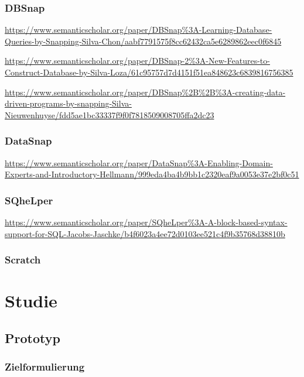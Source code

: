 \documentclass[oneside,a4paper,11pt,openright]{scrreprt}
\begin{document}
\clearpage



% 



\clearpage


\subsection{DBSnap}
\parencite{silvaDBSnapLearning2015}
\url{https://www.semanticscholar.org/paper/DBSnap\%3A-Learning-Database-Queries-by-Snapping-Silva-Chon/aabf7791575f8cc62432ca5e6289862eec0f6845}

\url{https://www.semanticscholar.org/paper/DBSnap-2\%3A-New-Features-to-Construct-Database-by-Silva-Loza/61c95757d7d4151f51ea848623c6839816756385}

\url{https://www.semanticscholar.org/paper/DBSnap\%2B\%2B\%3A-creating-data-driven-programs-by-snapping-Silva-Nieuwenhuyse/fdd5ae1bc33337f9f0f7818509008705ffa2dc23}

\subsection{DataSnap}
\parencite{hellmannDataSnapEnabling2015}
\url{https://www.semanticscholar.org/paper/DataSnap\%3A-Enabling-Domain-Experts-and-Introductory-Hellmann/999eda4ba4b9bb1c2320eaf9a0053e37e2bf0c51}

\subsection{SQheLper}
\parencite{jacobsSQheLperBlockbased2021}
\url{https://www.semanticscholar.org/paper/SQheLper\%3A-A-block-based-syntax-support-for-SQL-Jacobs-Jaschke/b4f6023a4ee72d0103ee521c4f9b35768d38810b}
\subsection{Scratch}


\chapter{Studie}
\section{Prototyp}
\subsection{Zielformulierung}
\end{document}
